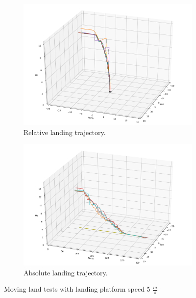 \begin{figure}[ht]
    \centering
    \begin{subfigure}[b]{0.49\textwidth}
        \centering
        \includegraphics[width=\textwidth]{images/moving_land_testing_5mps.png}
        \caption{Relative landing trajectory.}
        \label{subfig:moving_land_testing_5mps_relative}
    \end{subfigure}
    \begin{subfigure}[b]{0.49\textwidth}
        \centering
        \includegraphics[width=\textwidth]{images/moving_land_testing_5mps_absolute.png}
        \caption{Absolute landing trajectory.}
        \label{subfig:moving_land_testing_5mps_absolute}
    \end{subfigure}
    \caption{Moving land tests with landing platform speed 5 $\frac{m}{s}$}
    \label{fig:moving_land_testing_5mps}
\end{figure}

